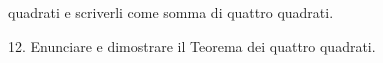 quadrati e scriverli come somma di quattro quadrati.\vss
\item{12.} Enunciare e dimostrare il Teorema dei quattro quadrati.\vv\ \vst\vskip-8mm
\bye
